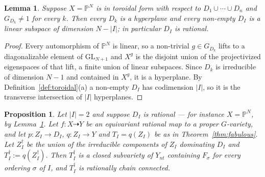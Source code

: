 \documentclass[11pt]{amsart}
\theoremstyle{plain}
\newtheorem{lemma}[theorem]{Lemma}
\newtheorem{proposition}[theorem]{Proposition}
\theoremstyle{definition}
\theoremstyle{remark}
\numberwithin{equation}{section}
\begin{document}
\begin{lemma} \label{lem:linear_strata}
Suppose $X = \mathbb{P}^N$ is in toroidal form with respect to
$D_1 \cup \cdots \cup D_n$ and $G_{D_k} \neq 1$ for every $k$.  Then every
$D_k$ is a hyperplane and every non-empty $D_I$ is a linear subspace of
dimension $N - |I|$; in particular $D_I$ is rational.
\end{lemma}

\begin{proof}
Every automorphism of $\mathbb{P}^N$ is linear, so a non-trivial
$g \in G_{D_k}$ lifts to a diagonalizable element of $\mathrm{GL}_{N+1}$
and $X^g$ is the disjoint union of the projectivized eigenspaces of that
lift, a finite union of linear subspaces.  Since $D_k$ is irreducible of
dimension $N-1$ and contained in $X^g$, it is a hyperplane.  By
Definition~\ref{def:toroidal}(a) a non-empty $D_I$ has codimension $|I|$,
so it is the transverse intersection of $|I|$ hyperplanes.
\end{proof}

\begin{proposition} \label{prop:rcc_total}
Let $|I| = 2$ and suppose $D_I$ is rational --- for instance
$X = \mathbb{P}^N$, by Lemma~\ref{lem:linear_strata}.  Let
$f : X \dasharrow Y$ be an equivariant rational map to a proper
$G$-variety, and let $p : Z_I \to D_I$, $q : Z_I \to Y$ and
$T_I = q(Z_I)$ be as in Theorem~\ref{thm:fabulous}.  Let $Z_I^\dagger$ be
the union of the irreducible components of $Z_I$ dominating $D_I$ and
$T_I^\dagger := q(Z_I^\dagger)$.  Then $T_I^\dagger$ is a closed subvariety
of $Y_{nt}$ containing $F_\sigma$ for every ordering $\sigma$ of $I$, and
$T_I^\dagger$ is rationally chain connected.
\end{proposition}
\end{document}
